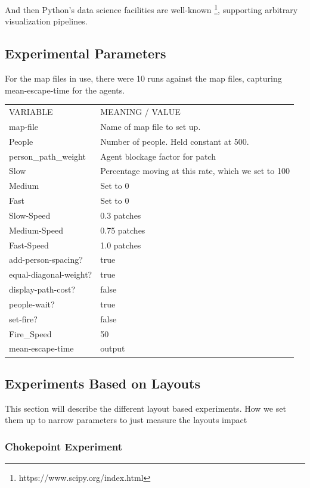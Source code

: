 \documentclass[12pt,letterpaper]{article}
\begin{document}
And then Python's data science facilities are well-known \footnote{https://www.scipy.org/index.html}, supporting arbitrary
visualization pipelines.

\subsection{Experimental Parameters}
For the map files in use, there were 10 runs against the map files, capturing
mean-escape-time for the agents.

\begin{tabular}{ l | l }
VARIABLE & MEANING / VALUE \\
map-file & Name of map file to set up. \\
People & Number  of people. Held constant at 500. \\
person\_path\_weight & Agent blockage factor for patch \\
Slow & Percentage moving at this rate, which we set to 100 \\
Medium & Set to 0 \\
Fast & Set to 0 \\
Slow-Speed & 0.3 patches \\
Medium-Speed & 0.75 patches \\
Fast-Speed & 1.0 patches \\
add-person-spacing? & true \\
equal-diagonal-weight? & true \\
display-path-cost? & false \\
people-wait? & true \\
set-fire? & false \\
Fire\_Speed & 50 \\
mean-escape-time & output \\
\end{tabular}

\subsection{Experiments Based on Layouts}
This section will describe the different layout based experiments.  How we set them up to narrow parameters to just measure the layouts impact

\subsubsection{Chokepoint Experiment}
\end{document}
